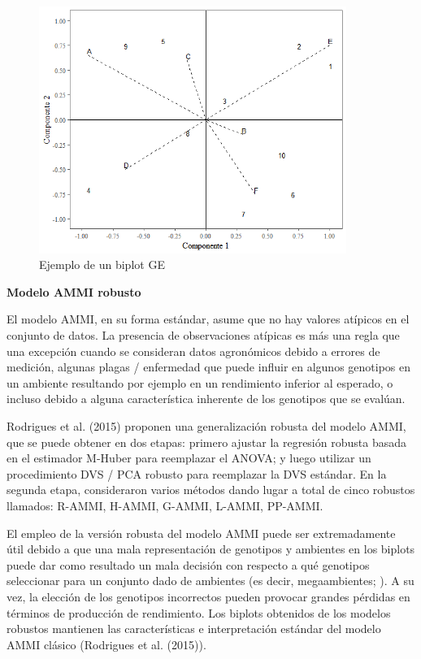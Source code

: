 \begin{figure}[h]
	\begin{center}
		\includegraphics[width=10cm]{./Graficos/GE_biplot.png}
	\end{center}
	\caption{Ejemplo de un biplot GE}
	\label{fig:fig311}
\end{figure}



\textbf{Modelo AMMI robusto}

El modelo AMMI, en su forma estándar, asume que no hay valores atípicos en el conjunto de datos. La presencia de observaciones atípicas es más una regla que una excepción cuando se consideran datos agronómicos debido a errores de medición, algunas plagas / enfermedad que puede influir en algunos genotipos en un ambiente resultando por ejemplo en un rendimiento inferior al esperado, o incluso debido a alguna característica inherente de los genotipos que se evalúan.

Rodrigues et al. (2015) proponen una generalización robusta del modelo AMMI, que se puede obtener en dos etapas: primero ajustar la regresión robusta basada en el estimador M-Huber \citep{Huber1981} para reemplazar el ANOVA; y luego utilizar un procedimiento DVS / PCA robusto para reemplazar la DVS estándar. En la segunda etapa, consideraron varios métodos dando lugar a total de cinco robustos llamados: R-AMMI, H-AMMI, G-AMMI, L-AMMI, PP-AMMI. 

El empleo de la versión robusta del modelo AMMI puede ser extremadamente útil debido a que una mala representación de genotipos y ambientes en los biplots puede dar como resultado un mala decisión con respecto a qué genotipos seleccionar para un conjunto dado de ambientes (es decir, megaambientes; \citealp{Gauch1997,Yanetal2000}). A su vez, la elección de los genotipos incorrectos pueden provocar grandes pérdidas en términos de producción de rendimiento. Los biplots obtenidos de los modelos robustos mantienen las características e interpretación estándar del modelo AMMI clásico (Rodrigues et al. (2015)).

